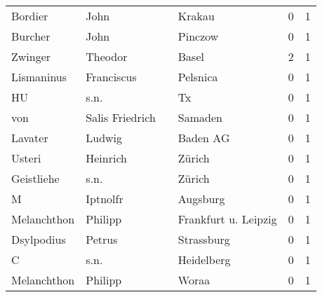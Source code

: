 \begin{center}
\begin{tiny}
\begin{longtabu}{llllrr}
                  Bordier &                               John &             &                                      Krakau &          0 &         1 \\
                  Burcher &                               John &             &                                     Pinczow &          0 &         1 \\
                  Zwinger &                            Theodor &             &                                       Basel &          2 &         1 \\
               Lismaninus &                         Franciscus &             &                                    Pelsnica &          0 &         1 \\
                       HU &                               s.n. &             &                                          Tx &          0 &         1 \\
                      von &                    Salis Friedrich &             &                                     Samaden &          0 &         1 \\
                  Lavater &                             Ludwig &             &                                    Baden AG &          0 &         1 \\
                   Usteri &                           Heinrich &             &                                      Zürich &          0 &         1 \\
               Geistliehe &                               s.n. &             &                                      Zürich &          0 &         1 \\
                        M &                           Iptnolfr &             &                                    Augsburg &          0 &         1 \\
              Melanchthon &                            Philipp &             &                        Frankfurt u. Leipzig &          0 &         1 \\
               Dsylpodius &                             Petrus &             &                                  Strassburg &          0 &         1 \\
                        C &                               s.n. &             &                                  Heidelberg &          0 &         1 \\
              Melanchthon &                            Philipp &             &                                       Woraa &          0 &         1 \\

\end{longtabu}
\end{tiny}
\end{center}
